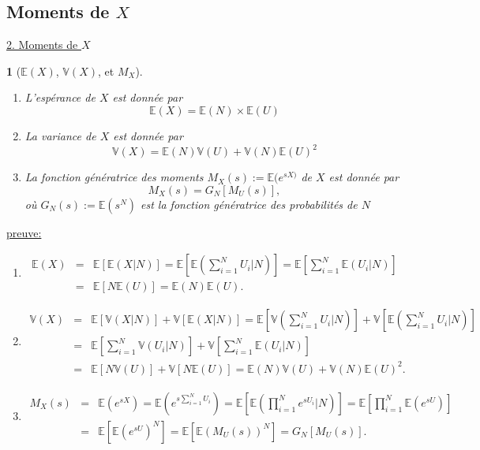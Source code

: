 \documentclass[8pt,notheorems]{beamer}
\def \E{\mathbb E}
\def \V{\mathbb V}
\newtheorem{prop}{\translate{Proposition}}
\theoremstyle{definition}
\theoremstyle{example}
\theoremstyle{mystyle}
\theoremstyle{plain}
\begin{document}
\subsection{Moments de $X$}
\begin{frame}[allowframebreaks]
\underline{2. Moments de $X$}\\
\begin{prop}[$\E(X)$, $\V(X)$, et $M_X$]
\begin{enumerate}
    \item L'espérance de $X$ est donnée par
    $$\E(X) = \E(N)\times \E(U)$$
    \item La variance de $X$ est donnée par
    $$\V(X) = \E(N)\V(U)+\V(N)\E(U)^2$$
    \item La fonction génératrice des moments $M_X(s) := \E(e^{sX)}$ de $X$ est donnée par
    $$M_X(s) = G_N\left[M_U(s)\right],$$
    où $G_N(s):=\E(s^N)$ est la fonction génératrice des probabilités de $N$
\end{enumerate}
\end{prop}
\underline{preuve:}\\
\begin{enumerate}
    \item
    \begin{eqnarray*}
    \E(X) &=& \E[\E(X|N)]=\E\left[\E\left(\sum_{i = 1}^{N}U_i|N\right)\right]= \E\left[\sum_{i = 1}^{N}\E\left(U_i|N\right)\right]\\
    &=& \E\left[N\E\left(U\right)\right]=\E(N)\E\left(U\right).
    \end{eqnarray*}
    \item
     \begin{eqnarray*}
    \V(X) &=& \E[\V(X|N)] + \V[\E(X|N)]= \E\left[\V\left(\sum_{i = 1}^{N}U_i|N\right)\right] + \V\left[\E\left(\sum_{i = 1}^{N}U_i|N\right)\right]\\
    &=& \E\left[\sum_{i = 1}^{N}\V\left(U_i|N\right)\right] + \V\left[\sum_{i = 1}^{N}\E\left(U_i|N\right)\right]\\
    &=& \E\left[N\V\left(U\right)\right] + \V\left[N\E\left(U\right)\right]= \E(N)\V\left(U\right) + \V(N)\E\left(U\right)^2.
    \end{eqnarray*}
    \item
    \begin{eqnarray*}
    M_X(s) &=& \E\left(e^{sX}\right)=\E\left(e^{s\sum_{i = 1}^{N}U_i}\right)= \E\left[\E\left(\prod_{i = 1}^{N}e^{sU_i}|N\right)\right]= \E\left[\prod_{i = 1}^{N}\E\left(e^{sU}\right)\right]\\
    &=& \E\left[\E\left(e^{sU}\right)^{N}\right]=\E\left[\E\left(M_U(s)\right)^{N}\right] = G_N\left[M_U(s)\right].

\end{eqnarray*}
\end{enumerate}
\end{frame}
\end{document}
